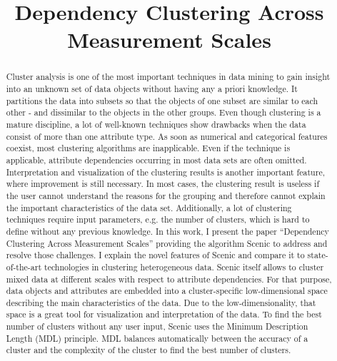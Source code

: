 \documentclass[conference]{IEEEtran}
\begin{document}
\title{Dependency Clustering Across Measurement Scales}
\author
{
}


\maketitle

\begin{abstract}
Cluster analysis is one of the most important techniques in data mining to gain insight into an unknown set of data objects without having any a priori knowledge. It partitions the data into subsets so that the objects of one subset are similar to each other - and dissimilar to the objects in the other groups. Even though clustering is a mature discipline, a lot of well-known techniques show drawbacks when the data consist of more than one attribute type. As soon as numerical and categorical features coexist, most clustering algorithms are inapplicable. Even if the technique is applicable, attribute dependencies occurring in most data sets are often omitted. Interpretation and visualization of the clustering results is another important feature, where improvement is still necessary. In most cases, the clustering result is useless if the user cannot understand the reasons for the grouping and therefore cannot explain the important characteristics of the data set. Additionally, a lot of clustering techniques require input parameters, e.g. the number of clusters, which is hard to define without any previous knowledge. 
In this work, I present the paper “Dependency Clustering Across Measurement Scales”\cite{scenic} providing the algorithm Scenic to address and resolve those challenges. I explain the novel features of Scenic and compare it to state-of-the-art technologies in clustering heterogeneous data. Scenic itself allows to cluster mixed data at different scales with respect to attribute dependencies. For that purpose, data objects and attributes are embedded into a cluster-specific low-dimensional space describing the main characteristics of the data. Due to the low-dimensionality, that space is a great tool for visualization and interpretation of the data. To find the best number of clusters without any user input, Scenic uses the Minimum Description Length  (MDL) principle. MDL balances automatically between the accuracy of a cluster and the complexity of the cluster to find the best number of clusters.

\end{abstract}
\end{document}
